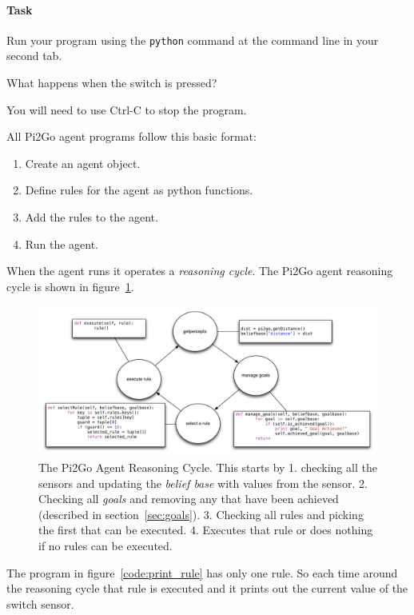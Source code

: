 \documentclass[a4,12pt]{article}
\begin{document}
\paragraph{Task}  Run your program using the \lstinline{python} command at the command line in your second tab.

\vspace{1cm}
\noindent What happens when the switch is pressed?
\medskip

\noindent You will need to use Ctrl-C to stop the program.

\newpage

\noindent All Pi2Go agent programs follow this basic format:
\begin{enumerate}
\item Create an agent object.
\item Define rules for the agent as python functions.
\item Add the rules to the agent.
\item Run the agent.
\end{enumerate}

When the agent runs it operates a \emph{reasoning cycle}.  The Pi2Go agent reasoning cycle is shown in figure~\ref{fig:reasoning_cycle}.
\begin{figure}[htbp]
  \begin{center}
    \includegraphics[width=14cm]{images/BDIPythonRC.pdf} 
  \end{center}
  \caption{The Pi2Go Agent Reasoning Cycle.  This starts by 1. checking all the sensors and updating the \emph{belief base} with values from the sensor.  2.  Checking all \emph{goals} and removing any that have been achieved (described in section~\ref{sec:goals}). 3. Checking all rules and picking the first that can be executed.  4.  Executes that rule or does nothing if no rules can be executed.}
  \label{fig:reasoning_cycle}
\end{figure}
The program in figure~\ref{code:print_rule} has only one rule.  So each time around the reasoning cycle that rule is executed and it prints out the current value of the switch sensor.
\end{document}
